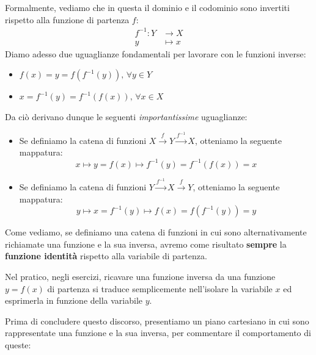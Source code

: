 \documentclass[12pt]{report}
\begin{document}
	Formalmente, vediamo che in questa il dominio e il codominio sono invertiti rispetto alla funzione di partenza $f$:
	\[
		\begin{aligned}
			f^{-1}: Y &\to X\\
			y &\mapsto x
		\end{aligned}
	\]
	Diamo adesso due uguaglianze fondamentali per lavorare con le funzioni inverse:
	\begin{itemize}
		
		\item $f(x) = y = f(f^{-1}(y)),\,\forall y \in Y$
		
		\item $x = f^{-1}(y) = f^{-1}(f(x)),\,\forall x \in X$
		
	\end{itemize}
	
	Da ciò derivano dunque le seguenti \textit{importantissime} uguaglianze:
	\begin{itemize}
		
		\item Se definiamo la catena di funzioni $X \xrightarrow{f} Y \xrightarrow{f^{-1}} X$, otteniamo la seguente mappatura:
		\[
			x \mapsto y=f(x) \mapsto f^{-1}(y) = f^{-1}(f(x)) = x
		\]
		
		\item Se definiamo la catena di funzioni $Y \xrightarrow{f^{-1}} X \xrightarrow{f} Y$, otteniamo la seguente mappatura:
		\[
		y \mapsto x=f^{-1}(y) \mapsto f(x) = f(f^{-1}(y)) = y
		\]
		
	\end{itemize}
	
	Come vediamo, se definiamo una catena di funzioni in cui sono alternativamente richiamate una funzione e la sua inversa, avremo come risultato \textbf{sempre} la \textbf{funzione identità} rispetto alla variabile di partenza.
	
	Nel pratico, negli esercizi, ricavare una funzione inversa da una funzione $y = f(x)$ di partenza si traduce semplicemente nell'isolare la variabile $x$ ed esprimerla in funzione della variabile $y$.
	
	Prima di concludere questo discorso, presentiamo un piano cartesiano in cui sono rappresentate una funzione e la sua inversa, per commentare il comportamento di queste:
	
\end{document}
